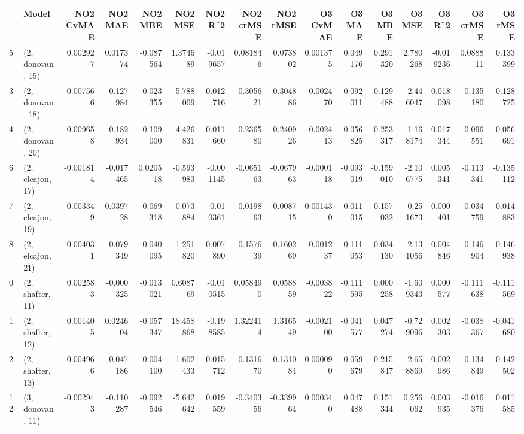 \begin{tabular}{llrrrrrrrrrrrrrr}
\toprule
{} &             Model &  NO2 CvMAE &   NO2 MAE &   NO2 MBE &    NO2 MSE &   NO2 R\textasciicircum2 &  NO2 crMSE &  NO2 rMSE &  O3 CvMAE &    O3 MAE &    O3 MBE &     O3 MSE &    O3 R\textasciicircum2 &  O3 crMSE &   O3 rMSE \\
\midrule
5  &  (2, donovan, 15) &   0.002927 &  0.017374 & -0.087564 &   1.374689 & -0.019657 &   0.081846 &  0.073802 &  0.001375 &  0.049176 &  0.291320 &   2.780268 & -0.019236 &  0.088811 &  0.133399 \\
3  &  (2, donovan, 18) &  -0.007566 & -0.127984 & -0.023355 &  -5.788009 &  0.012716 &  -0.305621 & -0.304886 & -0.002470 & -0.092011 &  0.129488 &  -2.446047 &  0.018098 & -0.135180 & -0.128725 \\
4  &  (2, donovan, 20) &  -0.009658 & -0.182934 & -0.109000 &  -4.426831 &  0.011660 &  -0.236580 & -0.240926 & -0.002413 & -0.056825 &  0.253317 &  -1.168174 &  0.017344 & -0.096551 & -0.056691 \\
6  &  (2, elcajon, 17) &  -0.001814 & -0.017465 &  0.020518 &  -0.593983 & -0.001145 &  -0.065163 & -0.067963 & -0.000118 & -0.093019 & -0.159010 &  -2.106775 &  0.005341 & -0.113341 & -0.135112 \\
7  &  (2, elcajon, 19) &   0.003349 &  0.039728 & -0.069318 &  -0.073884 & -0.010361 &  -0.019863 & -0.008715 &  0.001430 & -0.011015 &  0.157032 &  -0.251673 &  0.000401 & -0.034759 & -0.014883 \\
8  &  (2, elcajon, 21) &  -0.004031 & -0.079349 & -0.040095 &  -1.251820 &  0.007890 &  -0.157639 & -0.160269 & -0.001237 & -0.111053 & -0.034130 &  -2.131056 &  0.004846 & -0.146904 & -0.146938 \\
0  &  (2, shafter, 11) &   0.002583 & -0.000325 & -0.013021 &   0.608769 & -0.010515 &   0.058490 &  0.058859 & -0.003822 & -0.111595 &  0.000258 &  -1.609343 &  0.000577 & -0.111638 & -0.111569 \\
1  &  (2, shafter, 12) &   0.001405 &  0.024604 & -0.057347 &  18.458868 & -0.198585 &   1.322414 &  1.316549 & -0.002100 & -0.041577 &  0.047274 &  -0.729096 &  0.002303 & -0.038367 & -0.041680 \\
2  &  (2, shafter, 13) &  -0.004966 & -0.047186 & -0.004100 &  -1.602433 &  0.015712 &  -0.131670 & -0.131084 &  0.000090 & -0.059679 & -0.215847 &  -2.658869 &  0.002986 & -0.134849 & -0.142502 \\
12 &  (3, donovan, 11) &  -0.002943 & -0.110287 & -0.092546 &  -5.642642 &  0.019559 &  -0.340356 & -0.339964 &  0.000340 &  0.047488 &  0.151344 &   0.256062 &  0.003935 & -0.016376 &  0.011585 \\

\end{tabular}
